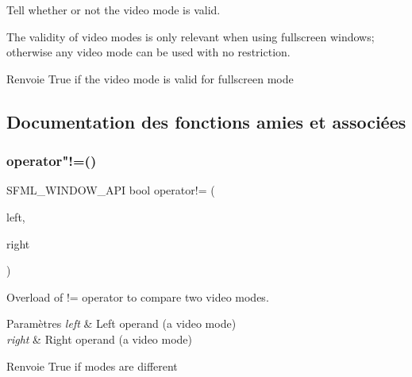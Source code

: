 Tell whether or not the video mode is valid. 

The validity of video modes is only relevant when using fullscreen windows; otherwise any video mode can be used with no restriction.

\begin{DoxyReturn}{Renvoie}
True if the video mode is valid for fullscreen mode 
\end{DoxyReturn}


\subsection{Documentation des fonctions amies et associées}
\mbox{\label{classsf_1_1VideoMode_abd7bf172d318085ea572b8c10033f7b7}} 
\subsubsection{\texorpdfstring{operator"!=()}{operator!=()}}
{\footnotesize\ttfamily S\+F\+M\+L\+\_\+\+W\+I\+N\+D\+O\+W\+\_\+\+A\+PI bool operator!= (\begin{DoxyParamCaption}\item[{const \hyperlink{classsf_1_1VideoMode}{Video\+Mode} \&}]{left,  }\item[{const \hyperlink{classsf_1_1VideoMode}{Video\+Mode} \&}]{right }\end{DoxyParamCaption})\hspace{0.3cm}{\ttfamily [related]}}



Overload of != operator to compare two video modes. 


\begin{DoxyParams}{Paramètres}
{\em left} & Left operand (a video mode) \\
\hline
{\em right} & Right operand (a video mode)\\
\hline
\end{DoxyParams}
\begin{DoxyReturn}{Renvoie}
True if modes are different 
\end{DoxyReturn}
\mbox{\label{classsf_1_1VideoMode_a8e3d8fa57fa10dca05edbc34c4e2f1a8}} 
